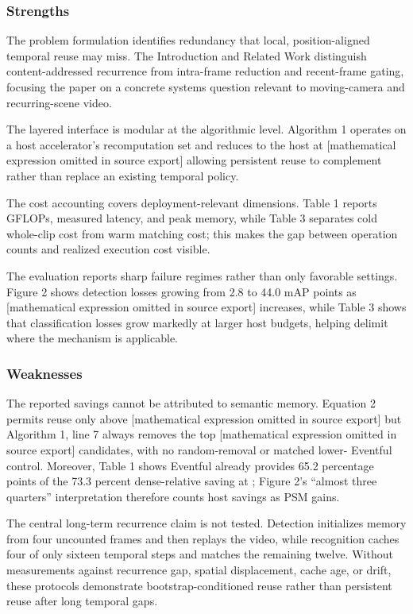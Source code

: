 \documentclass[11pt]{article}
\begin{document}
\subsubsection*{Strengths}

The problem formulation identifies redundancy that local, position-aligned temporal reuse may miss. The Introduction and Related Work distinguish content-addressed recurrence from intra-frame reduction and recent-frame gating, focusing the paper on a concrete systems question relevant to moving-camera and recurring-scene video.

The layered interface is modular at the algorithmic level. Algorithm 1 operates on a host accelerator's recomputation set and reduces to the host at [mathematical expression omitted in source export]  allowing persistent reuse to complement rather than replace an existing temporal policy.

The cost accounting covers deployment-relevant dimensions. Table 1 reports GFLOPs, measured latency, and peak memory, while Table 3 separates cold whole-clip cost from warm matching cost; this makes the gap between operation counts and realized execution cost visible.

The evaluation reports sharp failure regimes rather than only favorable settings. Figure 2 shows detection losses growing from 2.8 to 44.0 mAP points as [mathematical expression omitted in source export] increases, while Table 3 shows that classification losses grow markedly at larger host budgets, helping delimit where the mechanism is applicable.

\subsubsection*{Weaknesses}

The reported savings cannot be attributed to semantic memory. Equation 2 permits reuse only above [mathematical expression omitted in source export]  but Algorithm 1, line 7 always removes the top [mathematical expression omitted in source export] candidates, with no random-removal or matched lower-
 Eventful control. Moreover, Table 1 shows Eventful already provides 65.2 percentage points of the 73.3 percent dense-relative saving at 
; Figure 2's ``almost three quarters'' interpretation therefore counts host savings as PSM gains.

The central long-term recurrence claim is not tested. Detection initializes memory from four uncounted frames and then replays the video, while recognition caches four of only sixteen temporal steps and matches the remaining twelve. Without measurements against recurrence gap, spatial displacement, cache age, or drift, these protocols demonstrate bootstrap-conditioned reuse rather than persistent reuse after long temporal gaps.
\end{document}
